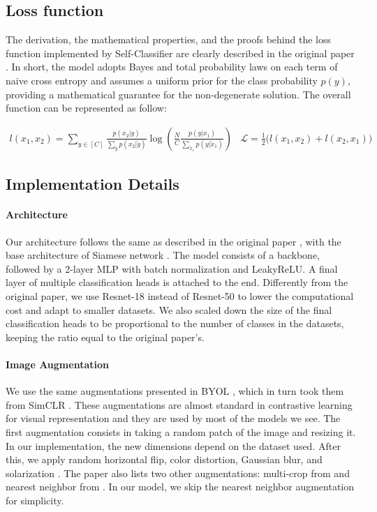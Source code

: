 \documentclass{article}
\begin{document}
\subsection{Loss function}
The derivation, the mathematical properties, and the proofs behind the loss function implemented by Self-Classifier are clearly described in the original paper \cite{self_classifier}. In short, the model adopts Bayes and total probability laws on each term of naive cross entropy and assumes a uniform prior for the class probability $p(y)$, providing a mathematical guarantee for the non-degenerate solution. The overall function can be represented as follow:

\[ 
\begin{array}{cc} 
    l(x_1, x_2) = \sum_{y \in [C]} \frac{p(x_2 | y)}{\sum_{\tilde{y}} p(x_2 | \tilde{y})} \log \left( \frac{N}{C} \frac{p(y | x_1)}{\sum_{\tilde{x}_1} p(y | \tilde{x}_1)} \right)
    &
    \mathcal{L} = \frac{1}{2} \Big( l(x_1, x_2) + l(x_2, x_1) \Big)
\end{array}
 \]


\subsection{Implementation Details}
\label{subsec:implementation_details}

\paragraph{Architecture}
Our architecture follows the same as described in the original paper \cite{self_classifier}, with the base architecture of Siamese network \cite{siamese_network}. The model consists of a backbone, followed by a 2-layer MLP with batch normalization and LeakyReLU. A final layer of multiple classification heads is attached to the end. 
Differently from the original paper, we use Resnet-18 instead of Resnet-50 \cite{resnet} to lower the computational cost and adapt to smaller datasets. 
We also scaled down the size of the final classification heads to be proportional to the number of classes in the datasets, keeping the ratio equal to the original paper's.

\paragraph{Image Augmentation}
We use the same augmentations presented in BYOL \cite{byol}, which in turn took them from SimCLR \cite{simclr}\cite{byol}. These augmentations are almost standard in contrastive learning for visual representation and they are used by most of the models we see.
The first augmentation consists in taking a random patch of the image and resizing it. In our implementation, the new dimensions depend on the dataset used. After this, we apply random horizontal flip, color distortion, Gaussian blur, and solarization \cite{byol}. The paper also lists two other augmentations: multi-crop from \cite{swav} and nearest neighbor from \cite{nn_augmentation}. In our model, we skip the nearest neighbor augmentation for simplicity.
\end{document}
